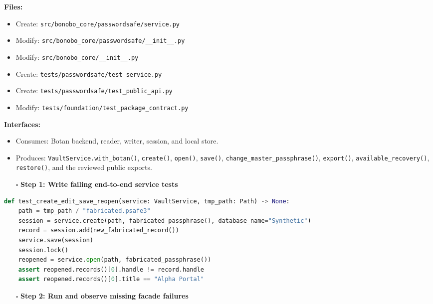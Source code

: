 \documentclass[
  letterpaper,
]{article}
\newcommand{\passthrough}[1]{#1}
\providecommand{\tightlist}{%
  \setlength{\itemsep}{0pt}\setlength{\parskip}{0pt}}
\begin{document}
\textbf{Files:}

\begin{itemize}
\tightlist
\item
  Create: \nolinkurl{src/bonobo_core/passwordsafe/service.py}
\item
  Modify: \nolinkurl{src/bonobo_core/passwordsafe/__init__.py}
\item
  Modify: \nolinkurl{src/bonobo_core/__init__.py}
\item
  Create: \nolinkurl{tests/passwordsafe/test_service.py}
\item
  Create: \nolinkurl{tests/passwordsafe/test_public_api.py}
\item
  Modify: \nolinkurl{tests/foundation/test_package_contract.py}
\end{itemize}

\textbf{Interfaces:}

\begin{itemize}
\tightlist
\item
  Consumes: Botan backend, reader, writer, session, and local store.
\item
  Produces: \nolinkurl{VaultService.with_botan()}, \passthrough{\lstinline!create()!}, \passthrough{\lstinline!open()!},
  \passthrough{\lstinline!save()!}, \nolinkurl{change_master_passphrase()}, \passthrough{\lstinline!export()!},
  \nolinkurl{available_recovery()}, \passthrough{\lstinline!restore()!}, and the reviewed public exports.
\end{itemize}

\begin{itemize}
\tightlist
\item[$\square$]
  \textbf{Step 1: Write failing end-to-end service tests}
\end{itemize}

\begin{lstlisting}[language=Python]
def test_create_edit_save_reopen(service: VaultService, tmp_path: Path) -> None:
    path = tmp_path / "fabricated.psafe3"
    session = service.create(path, fabricated_passphrase(), database_name="Synthetic")
    record = session.add(new_fabricated_record())
    service.save(session)
    session.lock()
    reopened = service.open(path, fabricated_passphrase())
    assert reopened.records()[0].handle != record.handle
    assert reopened.records()[0].title == "Alpha Portal"
\end{lstlisting}

\begin{itemize}
\tightlist
\item[$\square$]
  \textbf{Step 2: Run and observe missing facade failures}
\end{itemize}
\end{document}
